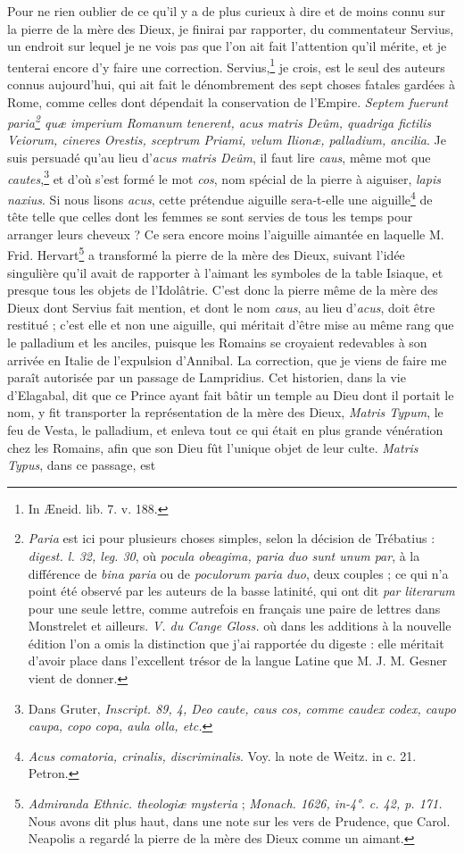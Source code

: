 \documentclass[a4paper, 11pt, oneside, polutonikogreek, french]{article}
\begin{document}
Pour ne rien oublier de ce qu'il y a de plus curieux à dire et de moins connu sur la pierre de la mère des Dieux, je finirai par rapporter, du commentateur Servius, un endroit sur lequel je ne vois pas que l'on ait fait l'attention qu'il mérite, et je tenterai encore d'y faire une correction. Servius,\footnote{In Æneid. lib. 7. v. 188.} je crois, est le seul des auteurs connus aujourd'hui, qui ait fait le dénombrement des sept choses fatales gardées à Rome, comme celles dont dépendait la conservation de l'Empire. \emph{Septem fuerunt paria\footnote{\emph{Paria} est ici pour plusieurs choses simples, selon la décision de Trébatius : \emph{digest. l. 32, leg. 30}, où \emph{pocula obeagima, paria duo sunt unum par}, à la différence de \emph{bina paria} ou de \emph{poculorum paria duo}, deux couples ; ce qui n'a point été observé par les auteurs de la basse latinité, qui ont dit \emph{par literarum} pour une seule lettre, comme autrefois en français une paire de lettres dans Monstrelet et ailleurs. \emph{V. du Cange Gloss.} où dans les additions à la nouvelle édition l'on a omis la distinction que j'ai rapportée du digeste : elle méritait d'avoir place dans l'excellent trésor de la langue Latine que M. J. M. Gesner vient de donner.} quæ imperium Romanum tenerent, acus matris Deûm, quadriga fictilis Veiorum, cineres Orestis, sceptrum Priami, velum Ilionæ, palladium, ancilia}. Je suis persuadé qu'au lieu d'\emph{acus matris Deûm}, il faut lire \emph{caus}, même mot que \emph{cautes},\footnote{Dans Gruter, \emph{Inscript. 89, 4, Deo caute, caus cos, comme caudex codex, caupo caupa, copo copa, aula olla, etc.}} et d'où s'est formé le mot \emph{cos}, nom spécial de la pierre à aiguiser, \emph{lapis naxius}. Si nous lisons \emph{acus}, cette prétendue aiguille sera-t-elle une aiguille\footnote{\emph{Acus comatoria, crinalis, discriminalis}. Voy. la note de Weitz. in c. 21. Petron.} de tête telle que celles dont les femmes se sont servies de tous les temps pour arranger leurs cheveux ? Ce sera encore moins l'aiguille aimantée en laquelle M. Frid. Hervart\footnote{\emph{Admiranda Ethnic. theologiæ mysteria} ; \emph{Monach. 1626, in-4°. c. 42, p. 171.} Nous avons dit plus haut, dans une note sur les vers de Prudence, que Carol. Neapolis a regardé la pierre de la mère des Dieux comme un aimant.} a transformé la pierre de la mère des Dieux, suivant l'idée singulière qu'il avait de rapporter à l'aimant les symboles de la table Isiaque, et presque tous les objets de l'Idolâtrie. C'est donc la pierre même de la mère des Dieux dont Servius fait mention, et dont le nom \emph{caus}, au lieu d'\emph{acus}, doit être restitué ; c'est elle et non une aiguille, qui méritait d'être mise au même rang que le palladium et les anciles, puisque les Romains se croyaient redevables à son arrivée en Italie de l'expulsion d'Annibal. La correction, que je viens de faire me paraît autorisée par un passage de Lampridius. Cet historien, dans la vie d'Elagabal, dit que ce Prince ayant fait bâtir un temple au Dieu dont il portait le nom, y fit transporter la représentation de la mère des Dieux, \emph{Matris Typum}, le feu de Vesta, le palladium, et enleva tout ce qui était en plus grande vénération chez les Romains, afin que son Dieu fût l'unique objet de leur culte. \emph{Matris Typus}, dans ce passage, est 
\end{document}
